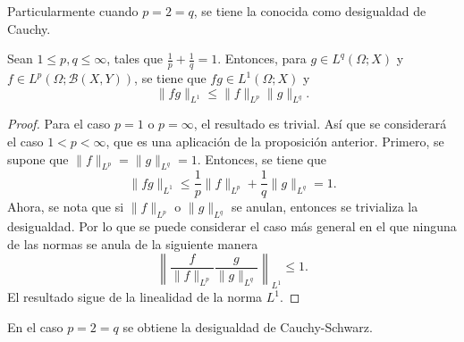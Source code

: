 Particularmente cuando $p=2=q$, se tiene la conocida como desigualdad de
Cauchy. 
\begin{proposition}
    Sean $1\leq p, q\leq \infty$, tales que $\frac{1}{p} + \frac{1}{q} = 1$.
    Entonces, para $g\in L^q(\Omega;X)$ y $f\in L^p(\Omega;\mathcal{B}(X, Y))$, se tiene
    que $fg \in L^1(\Omega;X)$ y 
    \begin{equation*}
        \|fg\|_{L^1} \leq \|f\|_{L^p}\|g\|_
        {L^q}.
    \end{equation*}
\end{proposition}
\begin{proof}
    Para el caso $p=1$ o $p=\infty$, el resultado es trivial. Así que 
    se considerará el caso $1<p<\infty$, que es una aplicación 
    de la proposición anterior. Primero, se supone
    que $\|f\|_{L^p} = \|g\|_{L^q} = 1$. Entonces, 
    se tiene que
    \begin{equation*}
        \|fg\|_{L^1} \leq \frac{1}{p}\|f\|_{L^p} + \frac{1}{q}\|g\|_{L^q} 
        = 1.
    \end{equation*}
    Ahora, se nota que si $\|f\|_{L^p}$ o $\|g\|_{L^q}$ se anulan, 
    entonces se trivializa la desigualdad. 
    Por lo que se puede considerar el caso más general en el que ninguna de las
    normas se anula de la siguiente manera
    \begin{equation*}
        \left\| \frac{f}{\|f\|_{L^p}} \frac{g}{\|g\|_{L^q}}
        \right\|_{L^1} \leq 1.
    \end{equation*}
    El resultado sigue de la linealidad de la norma $L^1$.
\end{proof}
En el caso $p=2=q$ se obtiene la desigualdad de Cauchy-Schwarz.

